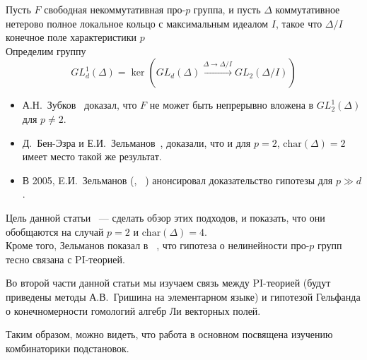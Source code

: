 \noindent
Пусть $F$ свободная некоммутативная про-$p$ группа, и пусть $\Delta$ коммутативное нетерово полное локальное кольцо с максимальным идеалом $I$, такое что
$\Delta/I$ конечное поле характеристики $p$\\
Определим группу
\[GL_d^1(\Delta) = \ker\left( GL_d(\Delta) \xrightarrow{\Delta\to\Delta/I} GL_2(\Delta/I) \right)\]
\begin{itemize}
    \item А.Н.\ Зубков~\cite{Zubkov} доказал, что $F$ не может быть непрерывно вложена в $GL_2^1(\Delta)$ для $p\neq2$.
    \item Д.\ Бен-Эзра и Е.И.\ Зельманов~\cite{Ben-Ezra-Zelmanov}, доказали, что и для $p=2$, $\mathrm{char}(\Delta)=2$ имеет место такой же результат.
    \item В 2005, E.И.\ Зельманов (\cite{Zelmanov1}, ~\cite{Zelmanov2}) анонсировал доказательство гипотезы для $p\gg d$.
\end{itemize}

Цель данной статьи ~--- сделать обзор этих подходов, и показать, что они обобщаются на случай $p=2$ и $\mathrm{char}(\Delta)=4$.\\
Кроме того, Зельманов показал в ~\cite{Zelmanov1}, что гипотеза о нелинейности про-$p$ групп тесно связана с PI-теорией.

Во второй части данной статьи мы изучаем связь между PI-теорией (будут приведены методы А.В.\ Гришина на элементарном языке)
и гипотезой Гельфанда о конечномерности гомологий алгебр Ли векторных полей.

Таким образом, можно видеть, что работа в основном посвящена изучению комбинаторики подстановок.